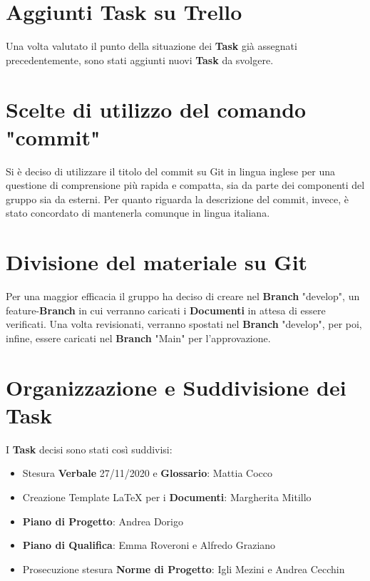 	\chapter{Aggiunti Task su Trello}
	Una volta valutato il punto della situazione dei \textbf{Task} già assegnati precedentemente, sono stati aggiunti nuovi \textbf{Task} da svolgere.
	
	\chapter{Scelte di utilizzo del comando "commit"}
	Si è deciso di utilizzare il titolo del commit su Git in lingua inglese per una questione di comprensione più rapida e compatta, sia da parte dei componenti del gruppo sia da esterni.
	Per quanto riguarda la descrizione del commit, invece, è stato concordato di mantenerla comunque in lingua italiana.
	
	\chapter{Divisione del materiale su Git}
	Per una maggior efficacia il gruppo ha deciso di creare nel \textbf{Branch} "develop", un feature-\textbf{Branch} in cui verranno caricati i \textbf{Documenti}
	in attesa di essere verificati. 
	Una volta revisionati, verranno spostati nel \textbf{Branch} "develop", per poi, infine, essere caricati nel \textbf{Branch}  "Main" per l'approvazione.
	
	\chapter{Organizzazione e Suddivisione dei Task}
	I \textbf{Task} decisi sono stati così suddivisi:
	\begin{itemize}
		\item Stesura \textbf{Verbale} 27/11/2020 e \textbf{Glossario}: Mattia Cocco
		\item Creazione Template LaTeX per i \textbf{Documenti}: Margherita Mitillo
		\item \textbf{Piano di Progetto}: Andrea Dorigo
		\item \textbf{Piano di Qualifica}: Emma Roveroni e Alfredo Graziano
		\item Prosecuzione stesura \textbf{Norme di Progetto}: Igli Mezini e Andrea Cecchin		
	\end{itemize}
	